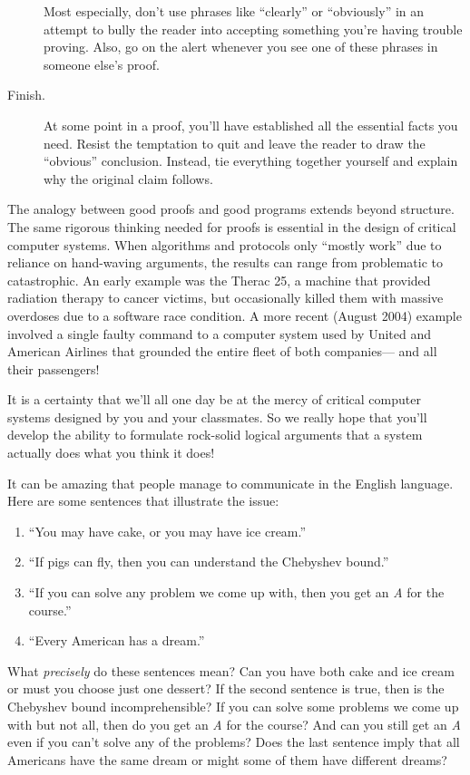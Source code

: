 \begin{description}
  Most especially, don't use phrases like ``clearly'' or ``obviously'' in
  an attempt to bully the reader into accepting something you're having
  trouble proving.  Also, go on the alert whenever you see one of these
  phrases in someone else's proof.

\item[Finish.]  At some point in a proof, you'll have established all the
essential facts you need.  Resist the temptation to quit and leave the
reader to draw the ``obvious'' conclusion.  Instead, tie everything
together yourself and explain why the original claim follows.

\end{description}

The analogy between good proofs and good programs extends beyond
structure.  The same rigorous thinking needed for proofs is essential in
the design of critical computer systems.  When algorithms and protocols
only ``mostly work'' due to reliance on hand-waving arguments, the results
can range from problematic to catastrophic.  An early example was the
Therac 25, a machine that provided radiation therapy to cancer victims,
but occasionally killed them with massive overdoses due to a software race
condition.  A more recent (August 2004) example involved a single faulty
command to a computer system used by United and American Airlines that
grounded the entire fleet of both companies--- and all their passengers!

It is a certainty that we'll all one day be at the mercy of critical
computer systems designed by you and your classmates.  So we really
hope that you'll develop the ability to formulate rock-solid logical
arguments that a system actually does what you think it does!



It can be amazing that people manage to communicate in the English
language.  Here are some sentences that illustrate the issue:
%
\begin{enumerate}
\item ``You may have cake, or you may have ice cream.''
\item ``If pigs can fly, then you can understand the Chebyshev bound.''
\item ``If you can solve any problem we come up with, then you get an
  \emph{A} for the course.''
\item ``Every American has a dream.''
\end{enumerate}
%
What \textit{precisely} do these sentences mean?  Can you have both cake
and ice cream or must you choose just one dessert?  If the second sentence
is true, then is the Chebyshev bound incomprehensible?  If you can solve
some problems we come up with but not all, then do you get an \emph{A} for
the course?  And can you still get an \emph{A} even if you can't solve any
of the problems?  Does the last sentence imply that all Americans have the
same dream or might some of them have different dreams?

